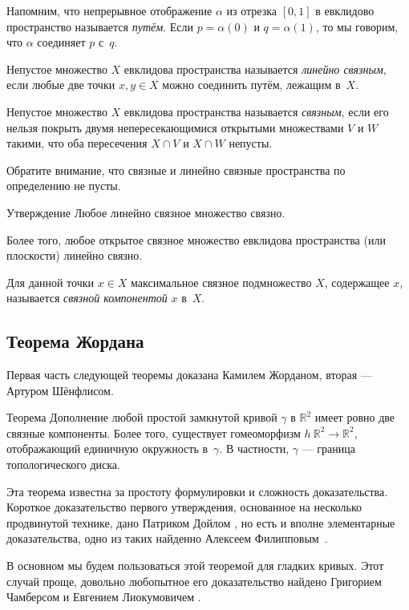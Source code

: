 Напомним, что непрерывное отображение $\alpha$ из отрезка $[0,1]$ в евклидово пространство называется \emph{путём}.
Если $p=\alpha (0)$ и $q = \alpha (1)$, то мы говорим, что $\alpha$ соединяет $p$ с~$q$.

Непустое множество $X$ евклидова пространства называется \emph{линейно связным}, если любые две точки $x,y\in X$ можно соединить путём, лежащим в~$X$.

Непустое множество $X$ евклидова пространства называется \emph{связным}, если его нельзя покрыть двумя непересекающимися открытыми множествами $V$ и $W$ такими, что оба пересечения $X\cap V$ и $X\cap W$ непусты.

Обратите внимание, что связные и линейно связные пространства по определению не пусты. 

\begin{thm}{Утверждение}
Любое линейно связное множество связно.

Более того, любое открытое связное множество евклидова пространства (или плоскости) линейно связно.
\end{thm}

Для данной точки $x\in X$ максимальное связное подмножество $X$, содержащее $x$, называется {}\emph{связной компонентой} $x$ в~$X$.

\subsection*{Теорема Жордана}

Первая часть следующей теоремы доказана Камилем Жорданом, вторая --- Артуром Шёнфлисом.

\begin{thm}{Теорема}\label{thm:jordan}
Дополнение любой простой замкнутой кривой $\gamma$ в $\mathbb{R}^2$ имеет ровно две связные компоненты. 
Более того, существует гомеоморфизм $h\:\mathbb{R}^2\to \mathbb{R}^2$, отображающий единичную окружность в~$\gamma$.
В частности, $\gamma$ --- граница топологического диска.
\end{thm}


Эта теорема известна за простоту формулировки и сложность доказательства.
Короткое доказательство первого утверждения, основанное на несколько продвинутой технике, дано Патриком Дойлом \cite{doyle}, но есть и вполне элементарные доказательства, одно из таких найденно Алексеем Филипповым~\cite{filippov}.

В основном мы будем пользоваться этой теоремой для гладких кривых.
Этот случай проще, довольно любопытное его доказательство найдено Григорием Чамберсом и Евгением Лиокумовичем \cite{chambers-liokumovich}.

